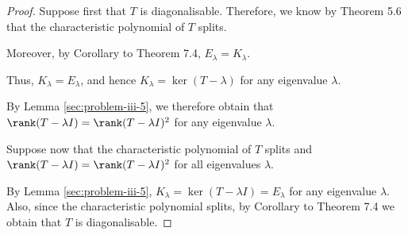 \documentclass[11pt]{scrartcl}
\begin{document}
\begin{proof}
  \hfill

  Suppose first that $T$ is diagonalisable. Therefore, we know by
  Theorem 5.6 that the characteristic polynomial of $T$
  splits.

  Moreover, by Corollary to Theorem 7.4, $E_{\lambda} =
  K_{\lambda}$.

  Thus, $K_{\lambda} = E_{\lambda}$, and hence
  $K_{\lambda} = \ker (T-\lambda)$ for any eigenvalue $\lambda$.

  By Lemma \ref{sec:problem-iii-5}, we therefore obtain that
  $\rank(T-\lambda I) = \rank(T-\lambda I)^2$ for any eigenvalue
  $\lambda$.

  Suppose now that the characteristic polynomial
  of $T$ splits and $\rank (T-\lambda I) = \rank (T-\lambda I)^2$ for
  all eigenvalues $\lambda$.

  By Lemma \ref{sec:problem-iii-5},
  $K_{\lambda} = \ker(T-\lambda I) = E_{\lambda}$ for any eigenvalue
  $\lambda$. Also, since the characteristic polynomial splits, by
  Corollary to Theorem 7.4 we obtain that $T$ is diagonalisable.
\end{proof}
\end{document}
